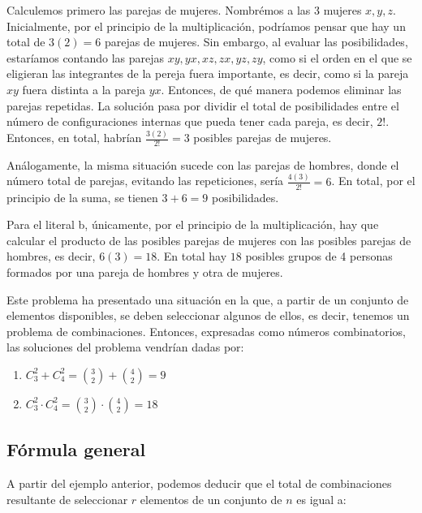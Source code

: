 \documentclass[12pt]{article}
\begin{document}
\begin{solucion}
    Calculemos primero las parejas de mujeres. Nombrémos a las 3 mujeres $x, y, z$. Inicialmente, por el principio de la multiplicación, podríamos pensar que hay un total de $3 (2) = 6$ parejas de mujeres. Sin embargo, al evaluar las posibilidades, estaríamos contando las parejas $xy, yx, xz, zx, yz, zy$, como si el orden en el que se eligieran las integrantes de la pereja fuera importante, es decir, como si la pareja $xy$ fuera distinta a la pareja $yx$. Entonces, de qué manera podemos eliminar las parejas repetidas. La solución pasa por dividir el total de posibilidades entre el número de configuraciones internas que pueda tener cada pareja, es decir, $2!$. Entonces, en total, habrían $\frac{3 (2)}{2!} = 3$ posibles parejas de mujeres. 
    
    Análogamente, la misma situación sucede con las parejas de hombres, donde el número total de parejas, evitando las repeticiones, sería $\frac{4 (3)}{2!}=6$. En total, por el principio de la suma, se tienen $3+6=9$ posibilidades.
    
    Para el literal b, únicamente, por el principio de la multiplicación, hay que calcular el producto de las posibles parejas de mujeres con las posibles parejas de hombres, es decir, $6 (3) = 18$. En total hay $18$ posibles grupos de 4 personas formados por una pareja de hombres y otra de mujeres.
\end{solucion}

Este problema ha presentado una situación en la que, a partir de un conjunto de elementos disponibles, se deben seleccionar algunos de ellos, es decir, tenemos un problema de combinaciones. Entonces, expresadas como números combinatorios, las soluciones del problema vendrían dadas por:

\renewcommand{\labelenumi}{\alph{enumi})}
\begin{enumerate}
    \item $C^{2}_{3}+C^{2}_{4} = \binom{3}{2}+\binom{4}{2} = 9$
    \item $ C^{2}_{3} \cdot C^{2}_{4} = \binom{3}{2} \cdot \binom{4}{2} = 18$
\end{enumerate}

\subsection{Fórmula general}

A partir del ejemplo anterior, podemos deducir que el total de combinaciones resultante de seleccionar $r$ elementos de un conjunto de $n$ es igual a:
\end{document}
